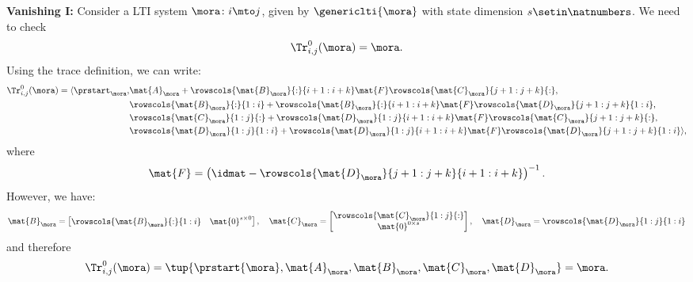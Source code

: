 {\begin{example}
        \textbf{Vanishing I:}
        Consider a LTI system $\mora\colon i\mto j$, given by $\genericlti{\mora}$ with state dimension $s\setin \natnumbers$.
        We need to check
        \begin{equation*}
            \Tr_{i,j}^0 (\mora)=\mora.
        \end{equation*}
        Using the trace definition, we can write:
        \begin{equation*}
            \begin{aligned}
                \Tr_{i,j}^0 (\mora)=\langle\prstart_{\mora}, & \mat{A}_\mora+\rowscols{\mat{B}_{\mora}}{:}{i+1:i+k}\mat{F}\rowscols{\mat{C}_{\mora}}{j+1:j+k}{:}, \\
                                                             & \rowscols{\mat{B}_{\mora}}{:}{1:i}+ \rowscols{\mat{B}_{\mora}}{:}{i+1:i+k}\mat{F}\rowscols{\mat{D}_{\mora}}{j+1:j+k}{1:i}, \\
                                                             & \rowscols{\mat{C}_{\mora}}{1:j}{:}+\rowscols{\mat{D}_{\mora}}{1:j}{i+1:i+k}\mat{F}\rowscols{\mat{C}_{\mora}}{j+1:j+k}{:}, \\
                                                             & \rowscols{\mat{D}_{\mora}}{1:j}{1:i}+ \rowscols{\mat{D}_{\mora}}{1:j}{i+1:i+k}\mat{F}\rowscols{\mat{D}_{\mora}}{j+1:j+k}{1:i}\rangle,
            \end{aligned}
        \end{equation*}
        where
        \begin{equation*}
            \mat{F}=\left(\idmat - \rowscols{\mat{D}_{\mora}}{j+1:j+k}{i+1:i+k}\right)^{-1}.
        \end{equation*}
        However, we have:
        \begin{equation*}
            \mat{B}_\mora=\begin{bmatrix}
                \rowscols{\mat{B}_{\mora}}{:}{1:i} & \mat{0}^{s\times 0}
            \end{bmatrix},\quad
            \mat{C}_\mora=\begin{bmatrix}
                \rowscols{\mat{C}_{\mora}}{1:j}{:} \\ \mat{0}^{0\times s}
            \end{bmatrix},
            \quad
            \mat{D}_\mora= \rowscols{\mat{D}_\mora}{1:j}{1:i}
        \end{equation*}
        and therefore
        \begin{equation*}
            \Tr_{i,j}^0 (\mora)=\tup{\prstart{\mora}, \mat{A}_\mora, \mat{B}_\mora, \mat{C}_\mora, \mat{D}_\mora}=\mora.
        \end{equation*}


\end{example}}
